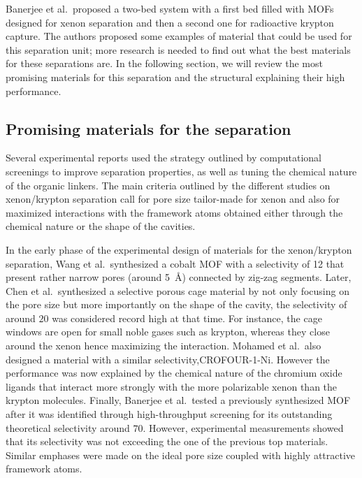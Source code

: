 \documentclass[main.tex]{subfiles}
\begin{document}
Banerjee et al.\ proposed a two-bed system with a first bed filled with MOFs designed for xenon separation and then a second one for radioactive krypton capture.\autocite{Banerjee_2014} The authors proposed some examples of material that could be used for this separation unit; more research is needed to find out what the best materials for these separations are. In the following section, we will review the most promising materials for this separation and the structural explaining their high performance. 


\subsection{Promising materials for the separation}

Several experimental reports used the strategy outlined by computational screenings to improve separation properties, as well as tuning the chemical nature of the organic linkers. The main criteria outlined by the different studies on xenon/krypton separation call for pore size tailor-made for xenon and also for maximized interactions with the framework atoms obtained either through the chemical nature or the shape of the cavities. 

In the early phase of the experimental design of materials for the xenon/krypton separation, Wang et al.\ synthesized a cobalt MOF  with a selectivity of 12 that present rather narrow pores (around \SI{5}{\angstrom}) connected by zig-zag segments.\autocite{Wang_2014} Later, Chen et al.\ synthesized a selective porous cage material by not only focusing on the pore size but more importantly on the shape of the cavity, the selectivity of around $20$ was considered record high at that time. For instance, the cage windows are open for small noble gases such as krypton, whereas they close around the xenon hence maximizing the interaction.\autocite{Chen_2014} Mohamed et al.\ also designed a material with a similar selectivity,CROFOUR-1-Ni. However the performance was now explained by the chemical nature of the chromium oxide ligands that interact more strongly with the more polarizable xenon than the krypton molecules.\autocite{Mohamed_2016} Finally, Banerjee et al.\ tested a previously synthesized\autocite{KAXQIL} MOF after it was identified through high-throughput screening\autocite{Simon_2015} for its outstanding theoretical selectivity around $70$. However, experimental measurements showed that its selectivity was not exceeding the one of the previous top materials. Similar emphases were made on the ideal pore size coupled with highly attractive framework atoms.\autocite{Banerjee_2016}
\end{document}
